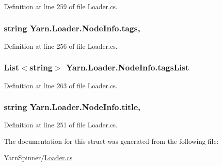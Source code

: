 Definition at line 259 of file Loader.\-cs.

\hypertarget{a00133_acd4d4915f6cc14f8b0f1f92d27da8b36}{
\subsubsection[{tags}]{\setlength{\rightskip}{0pt plus 5cm}string Yarn.\-Loader.\-Node\-Info.\-tags\hspace{0.3cm}{\ttfamily [get]}, {\ttfamily [set]}}}\label{a00133_acd4d4915f6cc14f8b0f1f92d27da8b36}


Definition at line 256 of file Loader.\-cs.

\hypertarget{a00133_ab5010cc4c731e0da871e6002e5fb99a1}{
\subsubsection[{tags\-List}]{\setlength{\rightskip}{0pt plus 5cm}List$<$string$>$ Yarn.\-Loader.\-Node\-Info.\-tags\-List\hspace{0.3cm}{\ttfamily [get]}}}\label{a00133_ab5010cc4c731e0da871e6002e5fb99a1}


Definition at line 263 of file Loader.\-cs.

\hypertarget{a00133_aafc45bbc86a9acb9bdbcf7877695a96c}{
\subsubsection[{title}]{\setlength{\rightskip}{0pt plus 5cm}string Yarn.\-Loader.\-Node\-Info.\-title\hspace{0.3cm}{\ttfamily [get]}, {\ttfamily [set]}}}\label{a00133_aafc45bbc86a9acb9bdbcf7877695a96c}


Definition at line 251 of file Loader.\-cs.



The documentation for this struct was generated from the following file\-:\begin{DoxyCompactItemize}
\item 
Yarn\-Spinner/\hyperlink{a00291}{Loader.\-cs}\end{DoxyCompactItemize}
